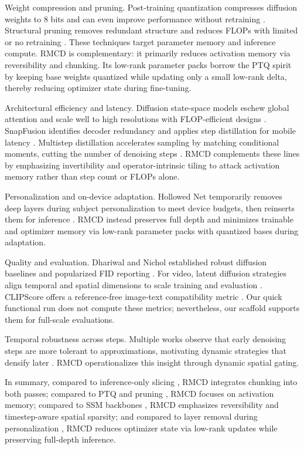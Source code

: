 \documentclass{article}
\begin{document}
Weight compression and pruning. Post-training quantization compresses diffusion weights to 8 bits and can even improve performance without retraining \cite{shang-2022-post}. Structural pruning removes redundant structure and reduces FLOPs with limited or no retraining \cite{fang-2023-structural}. These techniques target parameter memory and inference compute. RMCD is complementary: it primarily reduces activation memory via reversibility and chunking. Its low-rank parameter packs borrow the PTQ spirit by keeping base weights quantized while updating only a small low-rank delta, thereby reducing optimizer state during fine-tuning.

Architectural efficiency and latency. Diffusion state-space models eschew global attention and scale well to high resolutions with FLOP-efficient designs \cite{yan-2023-diffusion}. SnapFusion identifies decoder redundancy and applies step distillation for mobile latency \cite{li-2023-snapfusion}. Multistep distillation accelerates sampling by matching conditional moments, cutting the number of denoising steps \cite{salimans-2024-multistep}. RMCD complements these lines by emphasizing invertibility and operator-intrinsic tiling to attack activation memory rather than step count or FLOPs alone.

Personalization and on-device adaptation. Hollowed Net temporarily removes deep layers during subject personalization to meet device budgets, then reinserts them for inference \cite{cho-2024-hollowed}. RMCD instead preserves full depth and minimizes trainable and optimizer memory via low-rank parameter packs with quantized bases during adaptation.

Quality and evaluation. Dhariwal and Nichol established robust diffusion baselines and popularized FID reporting \cite{dhariwal-2021-diffusion}. For video, latent diffusion strategies align temporal and spatial dimensions to scale training and evaluation \cite{blattmann-2023-align}. CLIPScore offers a reference-free image-text compatibility metric \cite{hessel-2021-clipscore}. Our quick functional run does not compute these metrics; nevertheless, our scaffold supports them for full-scale evaluations.

Temporal robustness across steps. Multiple works observe that early denoising steps are more tolerant to approximations, motivating dynamic strategies that densify later \cite{author-year-leveraging}. RMCD operationalizes this insight through dynamic spatial gating.

In summary, compared to inference-only slicing \cite{zhan-2024-fast}, RMCD integrates chunking into both passes; compared to PTQ and pruning \cite{shang-2022-post,fang-2023-structural}, RMCD focuses on activation memory; compared to SSM backbones \cite{yan-2023-diffusion}, RMCD emphasizes reversibility and timestep-aware spatial sparsity; and compared to layer removal during personalization \cite{cho-2024-hollowed}, RMCD reduces optimizer state via low-rank updates while preserving full-depth inference.
\end{document}
